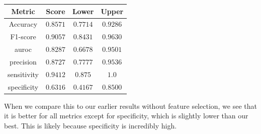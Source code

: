 \documentclass[11pt]{article}
\begin{document}
\begin{enumerate}
\begin{tabular}{| c | c | c | c |}
\hline
Metric & Score & Lower & Upper \\
\hline
Accuracy & $0.8571$ & $0.7714$ & $0.9286$ \\
F1-score & $0.9057$ & $0.8431$ & $0.9630$ \\
auroc & $0.8287$ & $0.6678$ & $0.9501$ \\
precision & $0.8727$ & $0.7777$ & $0.9536$ \\
sensitivity & $0.9412$ & $0.875$ & $1.0$ \\
specificity & $0.6316$ & $0.4167$ & $0.8500$ \\
\hline
\end{tabular}

When we compare this to our earlier results without feature selection, we see that it is better for all metrics
except for specificity, which is slightly lower than our best. This is likely because specificity is incredibly high. 

\end{enumerate}
\end{document}
